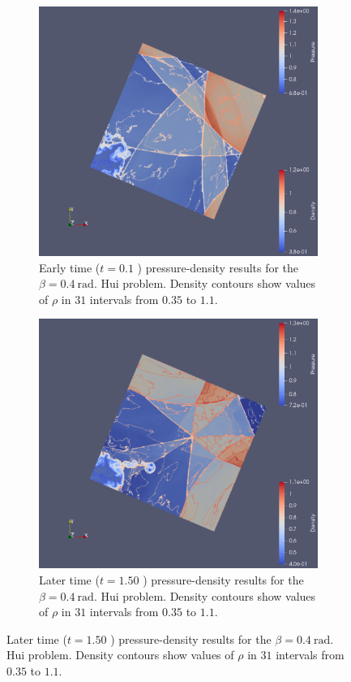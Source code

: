 \begin{figure}[h!]
\bigskip

\begin{subfigure}[h!]{0.4\linewidth}
\centering
\includegraphics[scale=0.16]{figures/GAH-Hui-400-0100-R.pdf }
\caption{Early time ($t = 0.1$ ) pressure-density results for the $\beta = 0.4 \ \mathrm{rad.}$ Hui problem. Density contours show values of $\rho$ in $31$ intervals from $0.35$ to $1.1$.}
  \label{fig:hui-Rot-250}
\end{subfigure}
\begin{subfigure}[h!]{0.4\linewidth}
\centering
\includegraphics[scale=0.16]{figures/GAH-Hui-400-1500-R.pdf }
\caption{Later time ($t = 1.50$ ) pressure-density results for the $\beta = 0.4 \ \mathrm{rad.}$ Hui problem. Density contours show values of $\rho$ in $31$ intervals from $0.35$ to $1.1$.}
  \label{fig:hui-Rot-1500}
\end{subfigure}


\end{figure}
